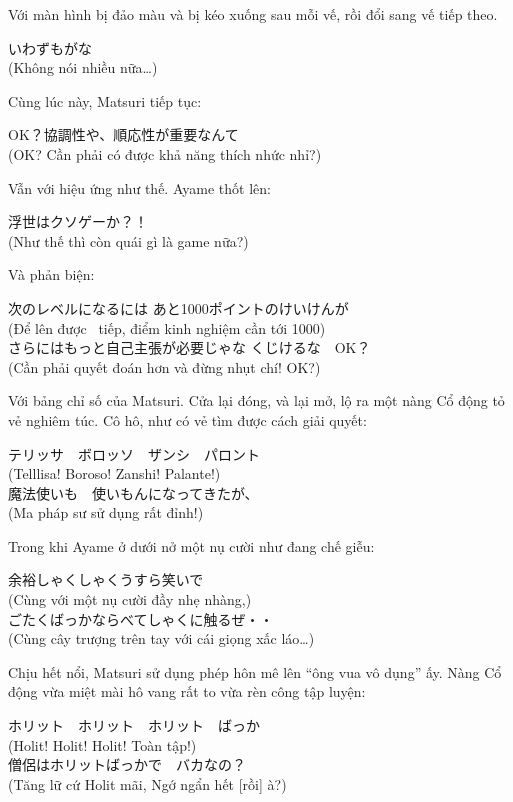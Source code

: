 \documentclass[../main.tex]{subfiles}
\begin{document}
Với màn hình bị đảo màu và bị kéo xuống sau mỗi vế, rồi đổi sang vế tiếp theo.
\begin{center}
  いわずもがな　\\ (Không nói nhiều nữa\dots )
\end{center}

Cùng lúc này, Matsuri tiếp tục:
\begin{center}
  OK？協調性や、順応性が重要なんて \\ (OK? Cần phải có được khả năng thích nhức nhỉ?)
\end{center}

Vẫn với hiệu ứng như thế. Ayame thốt lên:
\begin{center}
  浮世はクソゲーか？！ \\ (Như thế thì còn quái gì là game nữa?)
\end{center}

Và phản biện:
\begin{center}
  次のレベルになるには   あと1000ポイントのけいけんが \\ (Để lên được \ tiếp, điểm kinh nghiệm cần tới 1000) \\
  さらにはもっと自己主張が必要じゃな   くじけるな　OK？ \\ (Cần phải quyết đoán hơn và đừng nhụt chí! OK?)
\end{center}

Với bảng chỉ số của Matsuri. Cửa lại đóng, và lại mở, lộ ra một nàng Cổ động tỏ vẻ nghiêm túc. Cô hô, như có vẻ tìm được cách giải quyết:
\begin{center}
  テリッサ　ボロッソ　ザンシ　パロント \\ (Telllisa! Boroso! Zanshi! Palante!) \\
  魔法使いも　使いもんになってきたが、 \\ (Ma pháp sư sử dụng rất đỉnh!)
\end{center}

Trong khi Ayame ở dưới nở một nụ cười như đang chế giễu:
\begin{center}
  余裕しゃくしゃくうすら笑いで \\ (Cùng với một nụ cười đầy nhẹ nhàng,) \\
  ごたくばっかならべてしゃくに触るぜ・・ \\ (Cùng cây trượng trên tay với cái giọng xấc láo\dots )
\end{center}

Chịu hết nổi, Matsuri sử dụng phép hôn mê lên ``ông vua vô dụng'' ấy. Nàng Cổ động vừa miệt mài hô vang rất to vừa rèn công tập luyện:
\begin{center}
  ホリット　ホリット　ホリット　ばっか \\ (Holit! Holit! Holit! Toàn tập!) \\
  僧侶はホリットばっかで　バカなの？ \\ (Tăng lữ cứ Holit mãi, Ngớ ngẩn hết [rồi] à?)
\end{center}
\end{document}
